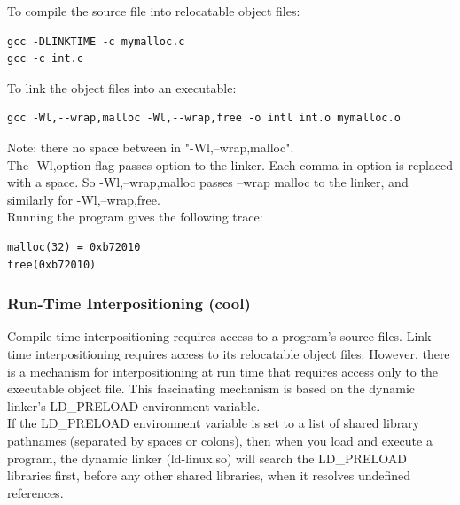\documentclass[11pt]{article}
\begin{document}
To compile the source file into relocatable object files:\\
\begin{verbatim}
gcc -DLINKTIME -c mymalloc.c
gcc -c int.c
\end{verbatim}

To link the object files into an executable:\\
\begin{verbatim}
gcc -Wl,--wrap,malloc -Wl,--wrap,free -o intl int.o mymalloc.o
\end{verbatim}
Note: there no space between in "-Wl,--wrap,malloc".\\
The -Wl,option flag passes option to the linker. Each comma in option is replaced with a space. So -Wl,--wrap,malloc passes --wrap malloc to the linker, and similarly for -Wl,--wrap,free.\\

Running the program gives the following trace:\\
\begin{verbatim}
malloc(32) = 0xb72010
free(0xb72010)
\end{verbatim}

\subsubsection{Run-Time Interpositioning (cool)}
\label{sec:orgc34ff4d}
Compile-time interpositioning requires access to a program’s source files. Link- time interpositioning requires access to its relocatable object files. However, there is a mechanism for interpositioning at run time that requires access only to the executable object file. This fascinating mechanism is based on the dynamic linker’s LD\_PRELOAD environment variable.\\

If the LD\_PRELOAD environment variable is set to a list of shared library pathnames (separated by spaces or colons), then when you load and execute a program, the dynamic linker (ld-linux.so) will search the LD\_PRELOAD libraries first, before any other shared libraries, when it resolves undefined references.\\
\end{document}
